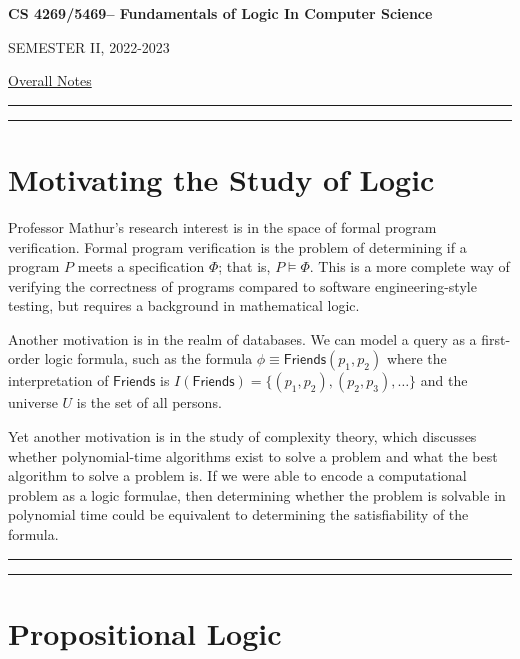 \documentclass[11pt,usenames, dvipsnames]{article}
\newcommand{\masunitnumber}{CS 4269/5469}
\newcommand{\academicyear}{2022-2023}
\newcommand{\semester}{II}
\newcommand{\coursename}{Fundamentals of Logic In Computer Science}
\begin{document}
\setlength{\headsep}{5truemm}
\setlength{\headheight}{14.5truemm}
\setlength{\voffset}{-0.45truein}
\renewcommand{\headrulewidth}{0.0pt}

\begin{center}
{\Large \bf \masunitnumber -- \coursename}
\end{center}

\begin{center}
SEMESTER \semester, \academicyear
\end{center}

\begin{center}
\underline{Overall Notes}\\
\end{center}

\vspace{5truemm}
\hrule
\hrule

\section{\large \centering Motivating the Study of Logic}
\noindent

Professor Mathur's research interest is in the space of formal program verification. Formal program verification is the problem of determining if a program $P$ meets a specification $\Phi$; that is, $P \models \Phi$. This is a more complete way of verifying the correctness of programs compared to software engineering-style testing, but requires a background in mathematical logic.

Another motivation is in the realm of databases. We can model a query as a first-order logic formula, such as the formula $\phi \equiv \mathsf{Friends}(p_1, p_2)$ where the interpretation of $\mathsf{Friends}$ is $I(\mathsf{Friends}) = \{(p_1, p_2), (p_2, p_3), \ldots \}$ and the universe $U$ is the set of all persons.

Yet another motivation is in the study of complexity theory, which discusses whether polynomial-time algorithms exist to solve a problem and what the best algorithm to solve a problem is. If we were able to encode a computational problem as a logic formulae, then determining whether the problem is solvable in polynomial time could be equivalent to determining the satisfiability of the formula.

\vspace{5truemm}
\hrule
\hrule

\section{\large \centering Propositional Logic}
\noindent
\end{document}
